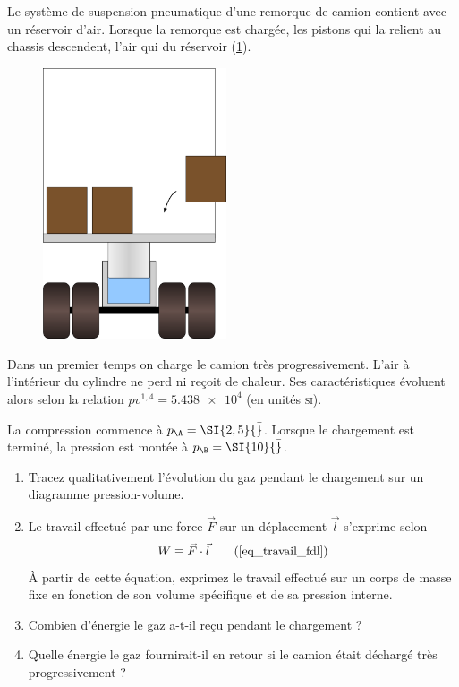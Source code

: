	Le système de suspension pneumatique d’une remorque de camion contient avec un réservoir d’air. Lorsque la remorque est chargée, les pistons qui la relient au chassis descendent, l’air qui du réservoir (\cref{fig_camion}).

	\begin{figure}
	\begin{center}
		\includegraphics[height=8cm]{images/piston_camion.png}
	\end{center}
	\label{fig_camion}
	\end{figure}
	
	Dans un premier temps on charge le camion très progressivement. L’air à l’intérieur du cylindre ne perd ni reçoit de chaleur. Ses caractéristiques évoluent alors selon la relation $p v^{1,4} = \num{5,438e4}$ (en unités \textsc{si}).
	
	La compression commence à $p_\A = \SI{2,5}{\bar}$. Lorsque le chargement est terminé, la pression est montée à $p_\B = \SI{10}{\bar}$. 
	
	\begin{enumerate}
		\item Tracez qualitativement l’évolution du gaz pendant le chargement sur un diagramme pression-volume.
		\item Le travail effectué par une force $\vec F$ sur un déplacement $\vec l$ s’exprime selon
			\begin{equation}
				W \equiv \vec F \cdot \vec l 	\tag{\ref{eq_travail_fdl}}
			\end{equation}
			À partir de cette équation, exprimez le travail effectué sur un corps de masse fixe en fonction de son volume spécifique et de sa pression interne.
		\item Combien d’énergie le gaz a-t-il reçu pendant le chargement ?
		\item Quelle énergie le gaz fournirait-il en retour si le camion était déchargé très progressivement ?
	\end{enumerate}
	
